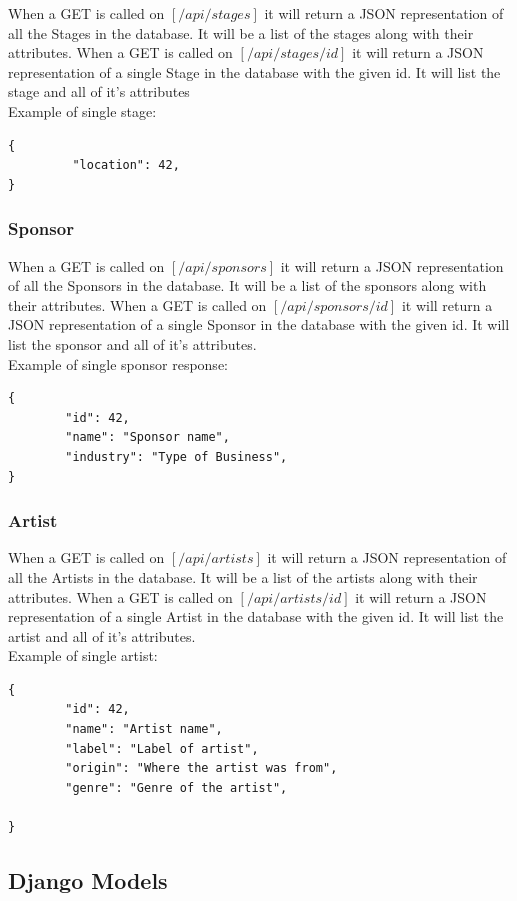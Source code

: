 \documentclass[12pt,english]{scrartcl}
\begin{document}
When a GET is called on $[/api/stages]$ it will return a JSON representation of all the Stages in the database.  It will be a list of the stages along with their attributes.
When a GET is called on $[/api/stages/{id}]$ it will return a JSON representation of a single Stage in the database with the given id.  It will list the stage and all of it's attributes
\\
Example of single stage:
\begin{verbatim}
{
         "location": 42,
}
\end{verbatim}
\subsubsection{Sponsor}

When a GET is called on $[/api/sponsors]$ it will return a JSON representation of all the Sponsors in the database.  It will be a list of the sponsors along with their attributes.
When a GET is called on $[/api/sponsors/{id}]$ it will return a JSON representation of a single Sponsor in the database with the given id.  It will list the sponsor and all of it's attributes.
\\
Example of single sponsor response:
\begin{verbatim}
{
        "id": 42,
        "name": "Sponsor name",
        "industry": "Type of Business",
}
\end{verbatim}

\subsubsection{Artist}

When a GET is called on $[/api/artists]$ it will return a JSON representation of all the Artists in the database.  It will be a list of the artists along with their attributes.
When a GET is called on $[/api/artists/{id}]$ it will return a JSON representation of a single Artist in the database with the given id.  It will list the artist and all of it's attributes.
\\
Example of single artist:
\begin{verbatim}
{
        "id": 42,
        "name": "Artist name",
        "label": "Label of artist",
        "origin": "Where the artist was from",
        "genre": "Genre of the artist",
        
}
\end{verbatim}



\subsection{Django Models}
\end{document}
